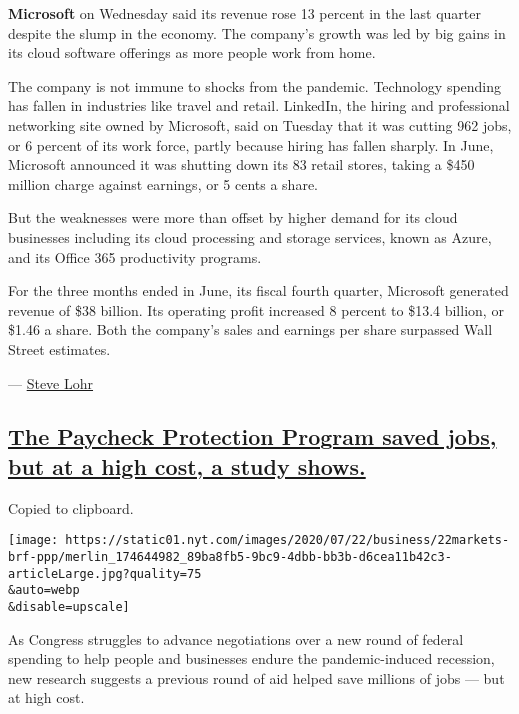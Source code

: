 \textbf{Microsoft} on Wednesday said its revenue rose 13 percent in the
last quarter despite the slump in the economy. The company's growth was
led by big gains in its cloud software offerings as more people work
from home.

The company is not immune to shocks from the pandemic. Technology
spending has fallen in industries like travel and retail. LinkedIn, the
hiring and professional networking site owned by Microsoft, said on
Tuesday that it was cutting 962 jobs, or 6 percent of its work force,
partly because hiring has fallen sharply. In June, Microsoft announced
it was shutting down its 83 retail stores, taking a \$450 million charge
against earnings, or 5 cents a share.

But the weaknesses were more than offset by higher demand for its cloud
businesses including its cloud processing and storage services, known as
Azure, and its Office 365 productivity programs.

For the three months ended in June, its fiscal fourth quarter, Microsoft
generated revenue of \$38 billion. Its operating profit increased 8
percent to \$13.4 billion, or \$1.46 a share. Both the company's sales
and earnings per share surpassed Wall Street estimates.

--- \href{https://www.nytimes.com/by/steve-lohr}{Steve Lohr}

\hypertarget{the-paycheck-protection-program-saved-jobs-but-at-a-high-cost-a-study-shows}{%
\subsection{\texorpdfstring{\protect\hyperlink{the-paycheck-protection-program-saved-jobs-but-at-a-high-cost-a-study-shows}{The
Paycheck Protection Program saved jobs, but at a high cost, a study
shows.}}{The Paycheck Protection Program saved jobs, but at a high cost, a study shows.}}\label{the-paycheck-protection-program-saved-jobs-but-at-a-high-cost-a-study-shows}}

Copied to clipboard.

\texttt{[image: https://static01.nyt.com/images/2020/07/22/business/22markets-brf-ppp/merlin\_174644982\_89ba8fb5-9bc9-4dbb-bb3b-d6cea11b42c3-articleLarge.jpg?quality=75\\\&auto=webp\\\&disable=upscale]}

As Congress struggles to advance negotiations over a new round of
federal spending to help people and businesses endure the
pandemic-induced recession, new research suggests a previous round of
aid helped save millions of jobs --- but at high cost.

